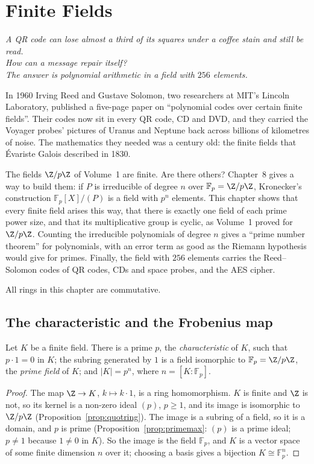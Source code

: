 \chapter{Finite Fields}

\begin{center}\itshape
A QR code can lose almost a third of its squares under a coffee stain and still be read.\\
How can a message repair itself?\\
The answer is polynomial arithmetic in a field with $256$ elements.
\end{center}

In 1960 Irving Reed and Gustave Solomon, two researchers at MIT's Lincoln Laboratory, published a five-page paper on ``polynomial codes over certain
finite fields''. Their codes now sit in every QR code, CD and DVD, and they carried the Voyager probes' pictures of Uranus and Neptune back across
billions of kilometres of noise. The mathematics they needed was a century old: the finite fields that \'Evariste Galois described in 1830.

The fields $\Z/p\Z$ of Volume~1 are finite. Are there others? Chapter~8 gives a way to build them: if $P$ is irreducible of degree $n$ over $\mathbb F_p=\Z/p\Z$, Kronecker's construction $\mathbb F_p[X]/(P)$ is a field with $p^n$ elements. This chapter shows that every finite field arises this way, that there is exactly one field of each prime power size, and that its multiplicative group is cyclic, as Volume~1 proved for $\Z/p\Z$. Counting the irreducible polynomials of degree $n$ gives a ``prime number theorem'' for polynomials, with an error term as good as the Riemann hypothesis would give for primes. Finally, the field with $256$ elements carries the Reed--Solomon codes of QR codes, CDs and space probes, and the AES cipher.

All rings in this chapter are commutative.

\section{The characteristic and the Frobenius map}

\begin{proposition}\label{prop:primefield}
Let $K$ be a finite field. There is a prime $p$, the \emph{characteristic} of $K$, such that $p\cdot1=0$ in $K$; the subring generated by $1$ is a field isomorphic to $\mathbb F_p=\Z/p\Z$, the \emph{prime field} of $K$; and $|K|=p^n$, where $n=[K:\mathbb F_p]$.
\end{proposition}
\begin{proof}
The map $\Z\to K$, $k\mapsto k\cdot1$, is a ring homomorphism. $K$ is finite and $\Z$ is not, so its kernel is a non-zero ideal $(p)$, $p\ge1$, and its image is isomorphic to $\Z/p\Z$ (Proposition~\ref{prop:quotring}). The image is a subring of a field, so it is a domain, and $p$ is prime (Proposition~\ref{prop:primemax}: $(p)$ is a prime ideal; $p\ne1$ because $1\ne0$ in $K$). So the image is the field $\mathbb F_p$, and $K$ is a vector space of some finite dimension $n$ over it; choosing a basis gives a bijection $K\cong\mathbb F_p^n$.
\end{proof}

